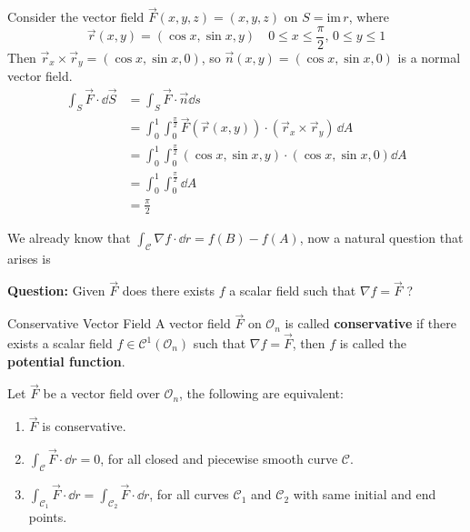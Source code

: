 \documentclass[../Analysis-3]{subfiles}
\begin{document}
\begin{Eg}{}{}
    Consider the vector field $\vec{F}(x,y,z) = (x,y,z)$ on $S = \mathrm{im} \, r$, where
    \[
        \vec{r}(x,y) = (\cos x, \sin x, y) \quad 0 \leq x \leq \frac{\pi}{2}, \, 0 \leq y \leq 1
    \]
    Then $\vec{r}_x \times \vec{r}_y = (\cos x, \sin x, 0)$, so $\vec{n}(x,y) = (\cos x, \sin x, 0)$ is a normal vector field.
    \begin{align*}
        \int_S \vec{F} \cdot \dd \vec{S} & = \int_S \vec{F} \cdot \vec{n} \dd s                                                                \\
                                         & = \int_0^1 \int_0^{\frac{\pi}{2}} \vec{F}(\vec{r}(x,y)) \cdot (\vec{r}_x \times \vec{r}_y) \, \dd A \\
                                         & = \int_0^1 \int_0^{\frac{\pi}{2}}  (\cos x, \sin x , y) \cdot (\cos x, \sin x, 0) \dd A             \\
                                         & = \int_0^1 \int_{0}^{\frac{\pi}{2}} \dd A                                                           \\
                                         & = \frac{\pi}{2}
    \end{align*}
\end{Eg}

We already know that $\int_{\mathcal{C}} \nabla f \cdot \dd r = f(B) - f(A)$, now a natural question that arises is

\textbf{Question:} Given $\vec{F}$ does there exists $f$ a scalar field such that $\nabla f = \vec{F}$ ?

\begin{Def}{Conservative Vector Field}{}
    A vector field $\vec{F}$ on $\mathcal{O}_n$ is called \textbf{conservative} if there exists a scalar field $f \in \mathscr{C}^1(\mathcal{O}_n)$ such that $\nabla f = \vec{F}$, then $f$ is called the \textbf{potential function}.
\end{Def}

\begin{Thm}{}{}\label{thm1:27}
    Let $\vec{F}$ be a vector field over $\mathcal{O}_n$, the following are equivalent:
    \begin{enumerate}
        \item $\vec{F}$ is conservative.
        \item $\int_{\mathcal{C}}\vec{F} \cdot \dd r = 0$, for all closed and piecewise smooth curve $\mathcal{C}$.
        \item $\int_{\mathcal{C}_1} \vec{F} \cdot \dd r = \int_{\mathcal{C}_2} \vec{F} \cdot \dd r$, for all curves $\mathcal{C}_1$ and $\mathcal{C}_2$ with same initial and end points.
    \end{enumerate}
\end{Thm}
\end{document}
